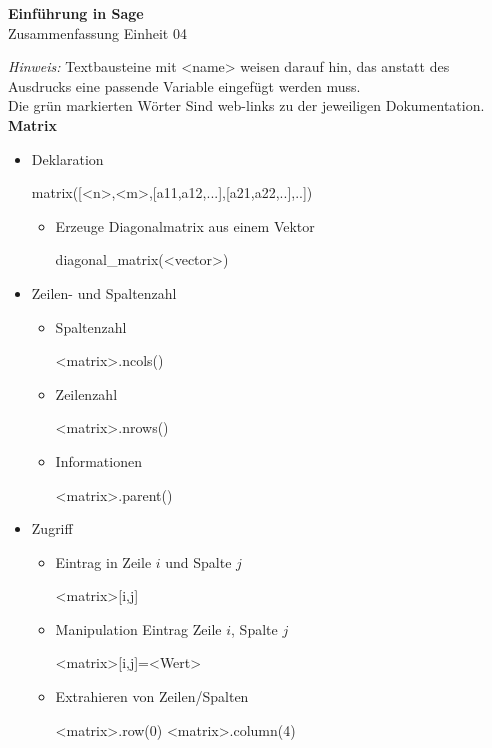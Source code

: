 \documentclass[a4paper,9pt,DIV15,twocolumn]{scrartcl}
\begin{document}
\begin{center}
    \textbf{\LARGE Einführung in Sage}\\
    {\large Zusammenfassung Einheit 04}
\end{center}
\textsl{Hinweis:} Textbausteine mit <name> weisen darauf hin, das anstatt des Ausdrucks eine passende Variable eingefügt werden muss.\\
Die {\color{Green}grün} markierten Wörter Sind web-links zu der jeweiligen Dokumentation.
\medskip
\textbf{Matrix}
\begin{itemize}
\item Deklaration
\begin{sagein}
matrix([<n>,<m>,[a11,a12,...],[a21,a22,..],..])
\end{sagein}
\begin{itemize}
\item Erzeuge Diagonalmatrix aus einem Vektor
\begin{sagein}
diagonal_matrix(<vector>)
\end{sagein}
\end{itemize}
\item Zeilen- und Spaltenzahl
\begin{itemize}
 \item Spaltenzahl 
\begin{sagein}
<matrix>.ncols()
\end{sagein}
\item Zeilenzahl 
\begin{sagein}
<matrix>.nrows()
\end{sagein}
\item Informationen
\begin{sagein}
<matrix>.parent()
\end{sagein}
\end{itemize}
\item Zugriff
\begin{itemize}
 \item Eintrag in Zeile $i$ und Spalte $j$
\begin{sagein}
<matrix>[i,j]
\end{sagein}
\item Manipulation Eintrag Zeile $i$, Spalte $j$
\begin{sagein}
<matrix>[i,j]=<Wert>
\end{sagein}
\item Extrahieren von Zeilen/Spalten
\begin{sagein}
<matrix>.row(0)
<matrix>.column(4)

\end{sagein}
\end{itemize}
\end{itemize}
\end{document}
